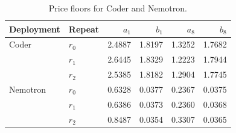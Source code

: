 \begin{table}[t]
\caption{Price floors for Coder and Nemotron.}
\label{tab:retail-unquoted}
\centering\small
\begin{tabular}{@{}llrrrr@{}}
\toprule
Deployment & Repeat & $a_1$ & $b_1$ & $a_8$ & $b_8$ \\
\midrule
Coder & $r_0$ & 2.4887 & 1.8197 & 1.3252 & 1.7682 \\
 & $r_1$ & 2.6445 & 1.8329 & 1.2223 & 1.7944 \\
 & $r_2$ & 2.5385 & 1.8182 & 1.2904 & 1.7745 \\
Nemotron & $r_0$ & 0.6328 & 0.0377 & 0.2367 & 0.0375 \\
 & $r_1$ & 0.6386 & 0.0373 & 0.2360 & 0.0368 \\
 & $r_2$ & 0.8487 & 0.0354 & 0.3307 & 0.0365 \\
\bottomrule
\end{tabular}
\end{table}
